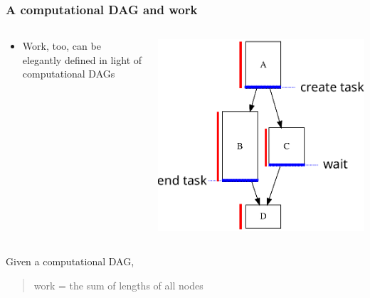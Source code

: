 \documentclass[12pt,dvipdfmx]{beamer}
\newcommand{\ao}[1]{{\color{blue}#1}}
\begin{document}
\begin{frame}[fragile]
\frametitle{A computational DAG and work}
\begin{columns}[t]
\begin{column}{0.65\textwidth}
\begin{itemize}
\item Work, too, can be elegantly defined in light of computational DAGs
\end{itemize}
\end{column}

\begin{column}{0.35\textwidth}
\begin{center}
\includegraphics[width=\textwidth]{out/pdf/svg/dag_work.pdf}
\end{center}
\end{column}
\end{columns}

Given a computational DAG,
\begin{quote}
\ao{work = the sum of lengths of all nodes}
\end{quote}

\end{frame}
\end{document}
